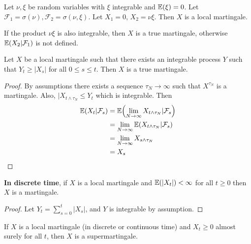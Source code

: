 \begin{exmp}
  \label{defn:discrete_time_models:17}
  Let $\nu, \xi$ be random variables with $\xi$ integrable and $\E{\xi}
  = 0$.  Let $\mathcal{F}_{1} = \sigma(\nu), \mathcal{F}_{2} =
  \sigma(\nu, \xi)$.  Let $X_{1} = 0$, $X_{2} = \nu \xi$.  Then $X$ is
  a local martingale.

  If the product $\nu \xi$ is also integrable, then $X$ is a true
  martingale, otherwise $\E{X_{2} | \mathcal{F}_{1}}$ is not defined.
\end{exmp}

\begin{proposition}
  Let $X$ be a local martingale such that there exists an integrable
  process $Y$ such that $Y_{t} \geq |X_{s} |$ for all $0 \leq s \leq
  t$. Then $X$ is a true martingale.
\end{proposition}

\begin{proof}
  By assumptions there exists a sequence $\tau_{N} \rightarrow \infty$
  such that $X^{\tau_{N}}$ is a martingale.  Also, $|X_{t \wedge
    \tau_{N}} \leq Y_{t}$ which is integrable.  Then
  \begin{align}
    \label{eq:15}
    \E{X_{t} | \mathcal{F}_{s}} &= \E{\lim_{N \rightarrow \infty} X_{t
        \wedge \tau_{N}} | \mathcal{F}_{s}} \\
    &= \lim_{N \rightarrow \infty} \E{X_{t \wedge \tau_{N}} |
      \mathcal{F}_{s}} \\
    &= \lim_{N \rightarrow \infty} X_{s \wedge \tau_{N}} \\
    &= X_{s}
  \end{align}
\end{proof}

\begin{corollary}
  \textbf{In discrete time}, if $X$ is a local martingale and
  $\E{|X_{t}|} < \infty$ for all $t \geq 0$ then $X$ is a martingale.
\end{corollary}

\begin{proof}
  Let $Y_{t} = \sum_{s=0}^{t} | X_{s} |$, and $Y$ is integrable by
  assumption.
\end{proof}

\begin{proposition}
  If $X$ is a local martingale (in discrete or continuous time) and
  $X_{t} \geq 0$ almost surely for all $t$, then $X$ is a
  supermartingale.
\end{proposition}

